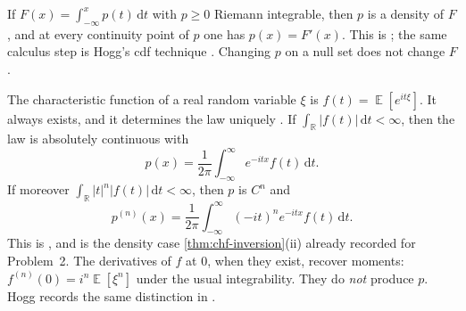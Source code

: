 \documentclass[11pt,a4paper]{article}
\DeclareMathOperator{\E}{\mathbb{E}}
\begin{document}
\begin{definition}
\label{def:pdf-from-cdf}
If \(F(x)=\int_{-\infty}^{x}p(t)\,\mathrm{d}t\) with \(p\ge 0\) Riemann integrable, then \(p\) is a density of \(F\), and at every continuity point of \(p\) one has \(p(x)=F'(x)\). This is \citep[Definition~4.3.2 and notes~2--4]{ren2024}; the same calculus step is Hogg's cdf technique \citep[\S1.7.2]{hogg2019}. Changing \(p\) on a null set does not change \(F\).
\end{definition}

\begin{definition}
\label{def:chf-inversion}
The characteristic function of a real random variable \(\xi\) is \(f(t)=\E[e^{it\xi}]\). It always exists, and it determines the law uniquely \citep[\S8.2--8.4]{ren2024}. If \(\int_{\mathbb{R}}|f(t)|\,\mathrm{d}t<\infty\), then the law is absolutely continuous with
\[
p(x)
=
\frac{1}{2\pi}
\int_{-\infty}^{\infty}
e^{-itx}f(t)\,\mathrm{d}t.
\]
If moreover \(\int_{\mathbb{R}}|t|^{n}|f(t)|\,\mathrm{d}t<\infty\), then \(p\) is \(C^{n}\) and
\[
p^{(n)}(x)
=
\frac{1}{2\pi}
\int_{-\infty}^{\infty}
(-it)^{n}e^{-itx}f(t)\,\mathrm{d}t.
\]
This is \citep[Theorem~8.4.4]{ren2024}, and is the density case \cref{thm:chf-inversion}(ii) already recorded for Problem~2. The derivatives of \(f\) at \(0\), when they exist, recover moments: \(f^{(n)}(0)=i^{n}\E[\xi^{n}]\) under the usual integrability. They do \emph{not} produce \(p\). Hogg records the same distinction in \citep[Remark~1.9.1]{hogg2019}.
\end{definition}
\end{document}
